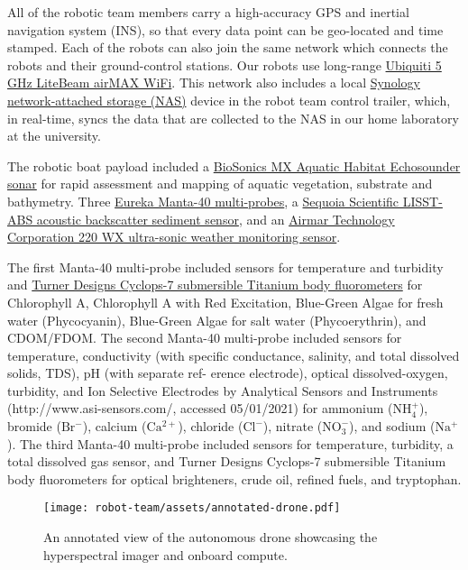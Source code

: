 All of the robotic team members carry a high-accuracy GPS and inertial navigation system (INS), so that every data point can be geo-located and time stamped. Each of the robots can also join the same network which connects the robots and their ground-control stations. Our robots use long-range \href{https://www.ui.com}{Ubiquiti 5 GHz LiteBeam airMAX WiFi}. This network also includes a local \href{https://www.synology.com}{Synology network-attached storage (NAS)} device in the robot team control trailer, which, in real-time, syncs the data that are collected to the NAS in our home laboratory at the university. 

The robotic boat payload included a \href{https://www.biosonicsinc.com/products/mx-aquatic-habitat-echosounder/}{BioSonics MX Aquatic Habitat Echosounder sonar} for rapid assessment and mapping of aquatic vegetation, substrate and bathymetry. Three \href{https://www.waterprobes.com/multiprobes-and-sondes-for-monitori}{Eureka Manta-40 multi-probes}, a \href{https://www.sequoiasci.com/product/lisst-abs/}{Sequoia Scientific LISST-ABS acoustic backscatter sediment sensor}, and an \href{https://www.airmar.com/weather-description.html?id=153}{Airmar Technology Corporation 220 WX ultra-sonic weather monitoring sensor}.

The first Manta-40 multi-probe included sensors for temperature and turbidity and \href{https://www.turnerdesigns.com/cyclops-7f-submersible-fluorometer}{Turner Designs Cyclops-7 submersible Titanium body fluorometers} for Chlorophyll A, Chlorophyll A with Red Excitation, Blue-Green Algae for fresh water (Phycocyanin), Blue-Green Algae for salt water (Phycoerythrin), and CDOM/FDOM. The second Manta-40 multi-probe included sensors for temperature, conductivity (with specific conductance, salinity, and total dissolved solids, TDS), pH (with separate ref-
erence electrode), optical dissolved-oxygen, turbidity, and Ion Selective Electrodes by Analytical Sensors and Instruments (http://www.asi-sensors.com/, accessed 05/01/2021)
for ammonium ($\mathrm{NH_4^+}$), bromide ($\mathrm{Br^−}$), calcium ($\mathrm{Ca^{2+}}$), chloride ($\mathrm{Cl^−}$), nitrate ($\mathrm{NO_3^{-}}$), and sodium ($\mathrm{Na^+}$). The third Manta-40 multi-probe included sensors for temperature, turbidity, a total dissolved gas sensor, and Turner Designs Cyclops-7 submersible Titanium body fluorometers for optical brighteners, crude oil, refined fuels, and tryptophan.

\begin{figure}[!hbt]
  \centering
  \texttt{[image: robot-team/assets/annotated-drone.pdf]}
  \caption{An annotated view of the autonomous drone showcasing the hyperspectral imager and onboard compute.}
  \label{fig:uav-closeup}
\end{figure}

